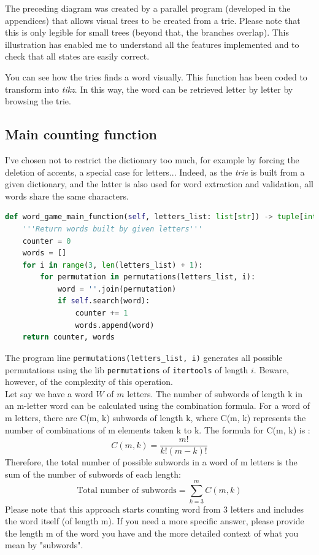\documentclass[10pt,a4paper,hidelinks]{article}
\begin{document}
The preceding diagram was created by a parallel program (developed in the appendices) that allows visual trees to be created from a trie. Please note that this is only legible for small trees (beyond that, the branches overlap). This illustration has enabled me to understand all the features implemented and to check that all states are easily correct.

You can see how the tries finds a word visually. This function has been coded to transform  into \textit{tikz}. In this way, the word can be retrieved letter by letter by browsing the trie.\\



\subsection{Main counting function}
I've chosen not to restrict the dictionary too much, for example by forcing the deletion of accents, a special case for letters... Indeed, as the \textit{trie} is built from a given dictionary, and the latter is also used for word extraction and validation, all words share the same characters.

\begin{lstlisting}[language=Python, caption=Test all permutations]
def word_game_main_function(self, letters_list: list[str]) -> tuple[int, list[str]]:
    '''Return words built by given letters'''
    counter = 0
    words = []
    for i in range(3, len(letters_list) + 1):
        for permutation in permutations(letters_list, i):
            word = ''.join(permutation)
            if self.search(word):
                counter += 1
                words.append(word)
    return counter, words
\end{lstlisting}

The program line \verb|permutations(letters_list, i)| generates all possible permutations using the lib \verb|permutations| of \verb|itertools| of length $i$. Beware, however, of the complexity of this operation.\\

Let say we have a word $W$ of $m$ letters.
The number of subwords of length k in an m-letter word can be calculated using the combination formula. For a word of m letters, there are C(m, k) subwords of length k, where C(m, k) represents the number of combinations of m elements taken k to k. The formula for C(m, k) is :
$$C(m, k) = \dfrac{m!}{k!(m - k)!}$$
Therefore, the total number of possible subwords in a word of m letters is the sum of the number of subwords of each length:
\begin{equation}
\text{Total number of subwords} = \sum_{k=3}^{m}C(m, k)
\label{eq:number_of_combination}
\end{equation}
Please note that this approach starts counting word from 3 letters and includes the word itself (of length m).
If you need a more specific answer, please provide the length m of the word you have and the more detailed context of what you mean by "subwords".

\end{document}
